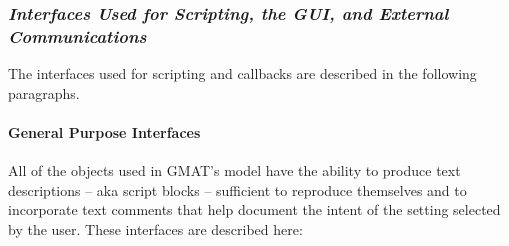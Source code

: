 \subsubsection{\textit{Interfaces Used for Scripting, the GUI, and External Communications}}

The interfaces used for scripting and callbacks are described in the following paragraphs.

\paragraph{General Purpose Interfaces}

All of the objects used in GMAT's model have the ability to produce text descriptions -- aka script
blocks -- sufficient to reproduce themselves and to incorporate text comments that help document the
intent of the setting selected by the user.  These interfaces are described here:

